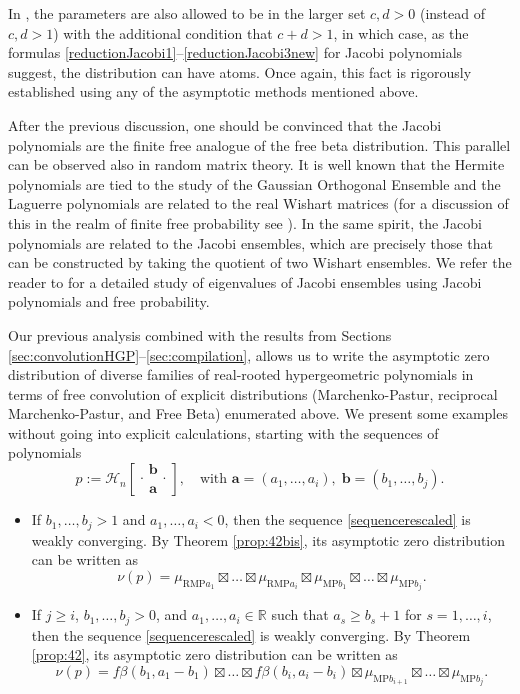 \documentclass[reqno,11pt]{amsart}
\theoremstyle{remark}
\newcommand{\rr}{\mathbb{R}}
\newcommand*\HGP[3]{%
 \mathcal{H}_{#1}{\left[\genfrac..{0pt}{1}{#2}{#3}\right]}%
}
\begin{document}
In \cite{yoshida2020remarks}, the parameters are also allowed to be in the larger set $c,d>0$ (instead of $c,d>1$) with the additional condition that $c+d>1$, in which case, as the formulas \eqref{reductionJacobi1}--\eqref{reductionJacobi3new} for Jacobi polynomials suggest, the distribution can have atoms. Once again, this fact is rigorously established using any of the asymptotic methods mentioned above. 

After the previous discussion, one should be convinced that the Jacobi polynomials are the finite free analogue of the free beta distribution. This parallel can be observed also in random matrix theory. It is well known that the Hermite polynomials are tied to the study of the Gaussian Orthogonal Ensemble and the Laguerre polynomials are related to the real Wishart matrices (for a discussion of this in the realm of finite free probability see \cite[Section 5]{arizmendi2021finite}). In the same spirit, the Jacobi polynomials are related to the Jacobi ensembles, which are precisely those that can be constructed by taking the quotient of two Wishart ensembles. We refer the reader to \cite{collins2005product} for a detailed study of eigenvalues of Jacobi ensembles using Jacobi polynomials and free probability.  

\medskip

Our previous analysis combined with the results from Sections \ref{sec:convolutionHGP}--\ref{sec:compilation}, allows us to write the asymptotic zero distribution of diverse families of real-rooted hypergeometric polynomials in terms of free convolution of explicit distributions (Marchenko-Pastur, reciprocal Marchenko-Pastur, and Free Beta) enumerated above. We present some examples without going into explicit calculations, starting with the sequences of polynomials 
\begin{equation} \label{sequencerescaled}
    p:=\HGP{n}{ \bm b}{\bm a}, \quad \text{with } \bm a = \left( a_1,\dots,a_{i} \right) , \; \bm b = \left( b_1,\dots,b_{j} \right).
\end{equation} 

\begin{itemize}
    \item If $b_1,\dots,b_j>1$ and $a_1,\dots,a_{i}<0$, then the sequence \eqref{sequencerescaled} is weakly converging. By Theorem \ref{prop:42bis}, its asymptotic zero distribution can be written as
$$
\nu(p)=\mu_{\text{RMP}a_1}\boxtimes  \dots \boxtimes \mu_{\text{RMP}a_i}\boxtimes \mu_{\text{MP} b_1} \boxtimes \dots \boxtimes \mu_{\text{MP} b_j}.
$$

\item If $j\geq i$, $b_1,\dots,b_j>0$, and $a_1,\dots,a_{i}\in \rr$ such that $a_s\geq b_s+1$ for $s=1,\dots,i$, then the sequence \eqref{sequencerescaled} is weakly converging. By Theorem \ref{prop:42}, its asymptotic zero distribution can be written as
$$
\nu(p)=f\beta(b_1, a_1-b_1)\boxtimes  \dots \boxtimes f\beta(b_i, a_i-b_i)\boxtimes \mu_{\text{MP} b_{i+1}} \boxtimes  \dots \boxtimes \mu_{\text{MP} b_j}.
$$
\end{itemize}
\end{document}
